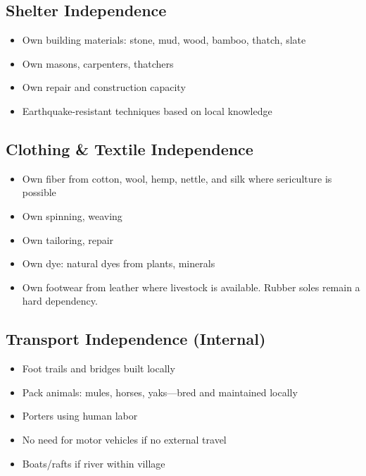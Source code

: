 \documentclass[11pt,a4paper]{article}
\begin{document}
\subsection{Shelter Independence}
\begin{itemize}
    \item Own building materials: stone, mud, wood, bamboo, thatch, slate
    \item Own masons, carpenters, thatchers
    \item Own repair and construction capacity
    \item Earthquake-resistant techniques based on local knowledge
\end{itemize}

\subsection{Clothing \& Textile Independence}
\begin{itemize}
    \item Own fiber from cotton, wool, hemp, nettle, and silk where sericulture is possible
    \item Own spinning, weaving
    \item Own tailoring, repair
    \item Own dye: natural dyes from plants, minerals
    \item Own footwear from leather where livestock is available. Rubber soles remain a hard dependency.
\end{itemize}

\subsection{Transport Independence (Internal)}
\begin{itemize}
    \item Foot trails and bridges built locally
    \item Pack animals: mules, horses, yaks---bred and maintained locally
    \item Porters using human labor
    \item No need for motor vehicles if no external travel
    \item Boats/rafts if river within village
\end{itemize}
\end{document}
